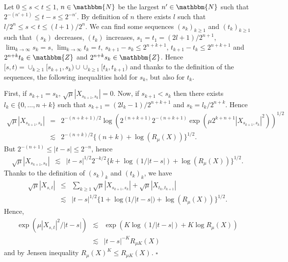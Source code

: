 \documentclass[a4paper,11pt]{article}
\newenvironment{proof}{{\sc Proof.}}{\hfill$\square$}
\begin{document}
\begin{proof}
  Let $0 \leqslant s<t \leqslant 1$, $n \in \mathbbm{N}$ be the largest $n' \in
  \mathbbm{N}$ such that $2^{- (n' +1)} \leqslant t-s \leqslant 2^{-n'}$. By
  definition of $n$ there exists $l$ such that $l/2^{n} \leqslant s<t
  \leqslant (l+1) /2^{n}$. We can find some sequences $(s_{k} )_{k \ge 1}$ and
  $(t_{k} )_{k \ge 1}$ such that $(s_{k} )$ decreases, $(t_{k} )$ increases,
  $s_{1} =t_{1} = (2l+1) /2^{n+1}$, $\lim_{k \to \infty}  s_{k} =s$, $\lim_{k
  \to \infty}  t_{k} =t$, $s_{k+1} -s_{k} \leqslant 2^{n+k+1}$, $t_{k+1}
  -t_{k} \leqslant 2^{n+k+1}$ and $2^{n+k} t_{k} \in \mathbbm{Z}$ and $2^{n+k}
  s_{k} \in \mathbbm{Z}$. Hence $[s,t) = \cup_{k \ge 1} [s_{k+1} ,s_{k} ) \cup
  \cup_{k \ge 1} [t_{k} ,t_{k+1} )$ and thanks to the definition of the
  sequences, the following inequalities hold for $s_{k}$, but also for
  $t_{k}$.
  
  First, if $s_{k+1} =s_{k}$, $\sqrt{\mu} | X_{s_{k+1} ,s_{k}} | =0$. Now, if
  $s_{k+1} <s_{k}$ then there exists $l_{k} \in \{ 0, \ldots ,n+k \}$ such
  that $s_{k+1} = ( 2l_{k} -1 ) /2^{n+k+1}$ and $s_{k} =l_{k} /2^{n+k}$. Hence
  \begin{eqnarray*}
    \sqrt{\mu} | X_{s_{k+1} ,s_{k}} | & = & 2^{- ( n+k+1 ) /2} \log ( 2^{(
    n+k+1 )} 2^{- ( n+k+1 )} \exp ( \mu 2^{k+n+1} | X_{s_{k+1} ,s_{k}} |^{2} )
    )^{1/2}\\
    & \lesssim & 2^{- ( n+k ) /2} \{ ( n+k ) + \log ( R_{\mu} ( X ) )
    \}^{1/2} .
  \end{eqnarray*}
  But $2^{- ( n+1 )} \leqslant | t-s | \leqslant 2^{-n}$, hence
  \begin{eqnarray*}
    \sqrt{\mu} | X_{s_{k+1} ,s_{k}} | & \lesssim   & | t-s |^{1/2} 2^{-k/2} \{
    k+ \log (1/| t-s |) + \log ( R_{\mu} ( X ) ) \}^{1/2} .
  \end{eqnarray*}
  Thanks to the definition of $( s_{k} )_{k}$ and $( t_{k} )_{k}$, we have
  \begin{eqnarray*}
    \sqrt{\mu} | X_{s,t} | & \leqslant & \sum_{k \geqslant 1} \sqrt{\mu} |
    X_{s_{k+1} ,s_{k}} | + \sqrt{\mu} | X_{t_{k} ,t_{k+1}} |\\
    & \lesssim & | t-s |^{1/2} \{ 1+ \log \big(1/| t-s |\big) + \log ( R_{\mu} ( X )
    ) \}^{1/2} .
  \end{eqnarray*}
  Hence,
  \begin{eqnarray*}
    \exp ( \mu | X_{s,t} |^{2} / | t-s | ) & \lesssim & \exp ( K  \log ( 1/ |
    t-s | ) +K  \log  R_{\mu} ( X ) )\\
    & \lesssim & | t-s |^{-K} R_{\mu K} ( X )
  \end{eqnarray*}
  and by Jensen inequality $R_{\mu} ( X )^{K} \leqslant R_{\mu K} ( X )^{}$.
\end{proof}
\end{document}
